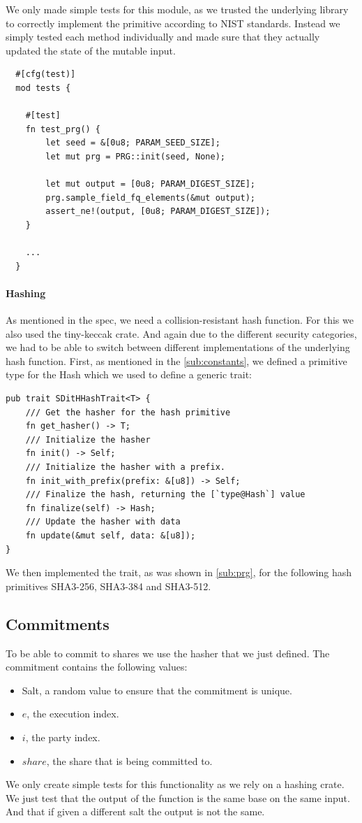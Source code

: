 \documentclass[11pt]{report}
\theoremstyle{definition}
\theoremstyle{plain}
\begin{document}
We only made simple tests for this module, as we trusted the underlying library to correctly implement the primitive according to NIST standards. Instead we simply tested each method individually and made sure that they actually updated the state of the mutable input.

\begin{verbatim}
  #[cfg(test)]
  mod tests {

    #[test]
    fn test_prg() {
        let seed = &[0u8; PARAM_SEED_SIZE];
        let mut prg = PRG::init(seed, None);

        let mut output = [0u8; PARAM_DIGEST_SIZE];
        prg.sample_field_fq_elements(&mut output);
        assert_ne!(output, [0u8; PARAM_DIGEST_SIZE]);
    }

    ...
  }
\end{verbatim}

\paragraph{Hashing}\label{sec:hashing} %
As mentioned in the spec, we need a collision-resistant hash function. For this we also used the tiny-keccak crate. And again due to the different security categories, we had to be able to switch between different implementations of the underlying hash function.
First, as mentioned in the \autoref{sub:constants}, we defined a primitive type for the Hash which we used to define a generic trait:
\begin{verbatim}
pub trait SDitHHashTrait<T> {
    /// Get the hasher for the hash primitive
    fn get_hasher() -> T;
    /// Initialize the hasher
    fn init() -> Self;
    /// Initialize the hasher with a prefix. 
    fn init_with_prefix(prefix: &[u8]) -> Self;
    /// Finalize the hash, returning the [`type@Hash`] value
    fn finalize(self) -> Hash;
    /// Update the hasher with data
    fn update(&mut self, data: &[u8]);
}
\end{verbatim}
We then implemented the trait, as was shown in \autoref{sub:prg}, for the following hash primitives SHA3-256, SHA3-384 and SHA3-512.

\subsection{Commitments}
To be able to commit to shares we use the hasher that we just defined. The commitment contains the following values:
\begin{itemize}
  \item Salt, a random value to ensure that the commitment is unique.
  \item $e$, the execution index.
  \item $i$, the party index.
  \item $share$, the share that is being committed to.
\end{itemize}
We only create simple tests for this functionality as we rely on a hashing crate. We just test that the output of the function is the same base on the same input. And that if given a different salt the output is not the same.
\end{document}

